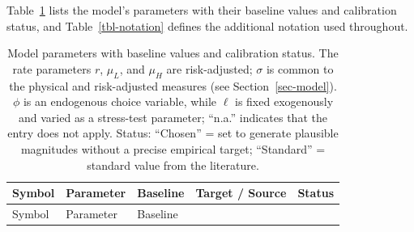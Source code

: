 \documentclass[
  11pt,
  letterpaper,
]{scrartcl}
\begin{document}
Table~\ref{tbl-parameters} lists the model's parameters with their
baseline values and calibration status, and Table~\ref{tbl-notation}
defines the additional notation used throughout.

\begin{longtable}[]{@{}
  >{\centering\arraybackslash}p{}
  >{\raggedright\arraybackslash}p{}
  >{\centering\arraybackslash}p{}
  >{\raggedright\arraybackslash}p{}
  >{\centering\arraybackslash}p{}@{}}
\caption{Model parameters with baseline values and calibration status.
The rate parameters \(r\), \(\mu_L\), and \(\mu_H\) are risk-adjusted;
\(\sigma\) is common to the physical and risk-adjusted measures (see
Section~\ref{sec-model}). \(\phi\) is an endogenous choice variable,
while \(\ell\) is fixed exogenously and varied as a stress-test
parameter; ``n.a.'' indicates that the entry does not apply. Status:
``Chosen'' = set to generate plausible magnitudes without a precise
empirical target; ``Standard'' = standard value from the
literature.}\label{tbl-parameters}\tabularnewline
\toprule\noalign{}
\begin{minipage}[b]{\linewidth}\centering
Symbol
\end{minipage} & \begin{minipage}[b]{\linewidth}\raggedright
Parameter
\end{minipage} & \begin{minipage}[b]{\linewidth}\centering
Baseline
\end{minipage} & \begin{minipage}[b]{\linewidth}\raggedright
Target / Source
\end{minipage} & \begin{minipage}[b]{\linewidth}\centering
Status
\end{minipage} \\
\midrule\noalign{}
\endfirsthead
\toprule\noalign{}
\begin{minipage}[b]{\linewidth}\centering
Symbol
\end{minipage} & \begin{minipage}[b]{\linewidth}\raggedright
Parameter
\end{minipage} & \begin{minipage}[b]{\linewidth}\centering
Baseline
\end{minipage} & \begin{minipage}[b]{\linewidth}\raggedright

\end{minipage}
\end{longtable}
\end{document}
